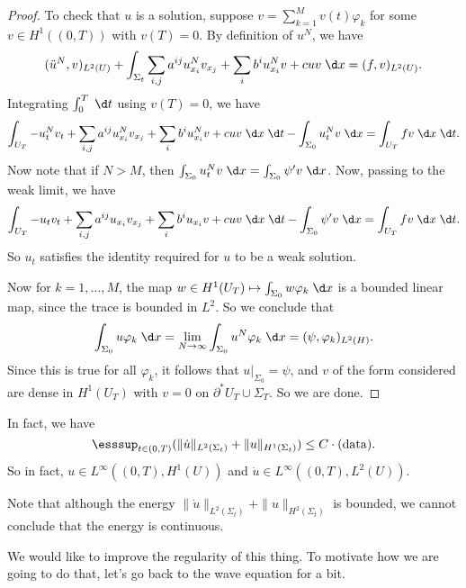 \documentclass[a4paper]{article}
\begin{document}
\begin{proof}
  To check that $u$ is a solution, suppose $v = \sum_{k = 1}^M v(t) \varphi_k$ for some $v \in H^1((0, T))$ with $v(T) = 0$. By definition of $u^N$, we have
  \[
    (\ddot{u}^N, v)_{L^2(U)} + \int_{\Sigma_t} \sum_{i, j} a^{ij} u_{x_i}^N v_{x_j} + \sum_i b^i u_{x_i}^N v + cuv \;\d x = (f, v)_{L^2(U)}.
  \]
  Integrating $\int_0^T \;\d t$ using $v(T) = 0$, we have
  \[
    \int_{U_T} -u_t^N v_t + \sum_{i, j} a^{ij} u_{x_i}^N v_{x_j} + \sum_i b^i u_{x_i}^N v + cuv \;\d x \;\d t - \int_{\Sigma_0} u_t^N v\;\d x = \int_{U_T} fv\;\d x\;\d t.
  \]
  Now note that if $N > M$, then $\int_{\Sigma_0} u_t^N v\;\d x = \int_{\Sigma_0} \psi' v \;\d x$. Now, passing to the weak limit, we have
  \[
    \int_{U_T} -u_t v_t + \sum_{i, j} a^{ij} u_{x_i} v_{x_j} + \sum_i b^i u_{x_i} v + cuv \;\d x \;\d t - \int_{\Sigma_0}\psi' v\;\d x = \int_{U_T} fv\;\d x\;\d t.
  \]
  So $u_t$ satisfies the identity required for $u$ to be a weak solution.

  Now for $k = 1, \ldots, M$, the map $w \in H^1(U_T) \mapsto \int_{\Sigma_0} w \varphi_k \;\d x$ is a bounded linear map, since the trace is bounded in $L^2$. So we conclude that
  \[
    \int_{\Sigma_0} u \varphi_k \;\d x = \lim_{N \to \infty} \int_{\Sigma_0} u^N \varphi_k \;\d x = (\psi, \varphi_k)_{L^2(H)}.
  \]
  Since this is true for all $\varphi_k$, it follows that $u|_{\Sigma_0} = \psi$, and $v$ of the form considered are dense in $H^1(U_T)$ with $v = 0$ on $\partial^*U_T \cup \Sigma_T$. So we are done.
\end{proof}

In fact, we have
\[
  \esssup_{t \in (0, T)} (\|\dot{u}\|_{L^2(\Sigma_t)} + \|u\|_{H^1(\Sigma_t)}) \leq C \cdot (\mathrm{data}).
\]
So in fact, $u \in L^\infty( (0, T), H^1(U))$ and $\dot{u} \in L^\infty((0, T), L^2(U))$.

Note that although the energy $\|\dot{u}\|_{L^2(\Sigma_t)} + \|u\|_{H^2(\Sigma_t)}$ is bounded, we cannot conclude that the energy is continuous.

We would like to improve the regularity of this thing. To motivate how we are going to do that, let's go back to the wave equation for a bit.
\end{document}
